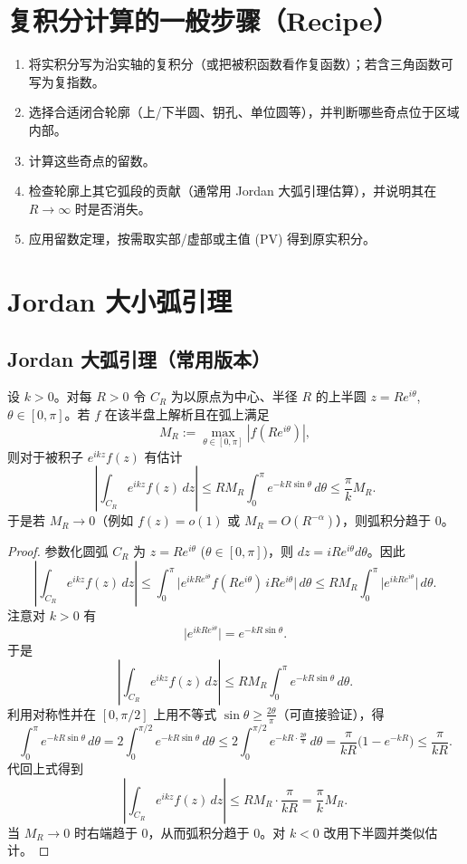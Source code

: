 \documentclass[lang=cn,10pt]{elegantbook}
\begin{document}
	\section{复积分计算的一般步骤（Recipe）}
	\begin{enumerate}[leftmargin=*,itemsep=4pt]
		\item 将实积分写为沿实轴的复积分（或把被积函数看作复函数）；若含三角函数可写为复指数。
		\item 选择合适闭合轮廓（上/下半圆、钥孔、单位圆等），并判断哪些奇点位于区域内部。
		\item 计算这些奇点的留数。
		\item 检查轮廓上其它弧段的贡献（通常用 Jordan 大弧引理估算），并说明其在 \(R\to\infty\) 时是否消失。
		\item 应用留数定理，按需取实部/虚部或主值 (PV) 得到原实积分。
	\end{enumerate}
	
	\section{Jordan 大小弧引理}
	\subsection{Jordan 大弧引理（常用版本）}
	
	\begin{definition}
		 设 \(k>0\)。对每 \(R>0\) 令 \(C_R\) 为以原点为中心、半径 \(R\) 的上半圆 \(z=R e^{i\theta}\), \(\theta\in[0,\pi]\)。若 \(f\) 在该半盘上解析且在弧上满足
		\[
		M_R:=\max_{\theta\in[0,\pi]}|f(R e^{i\theta})|,
		\]
		则对于被积子 \(e^{ikz}f(z)\) 有估计
		\[
		\left|\int_{C_R} e^{ikz} f(z)\,dz\right|
		\le R M_R \int_0^\pi e^{-kR\sin\theta}\,d\theta
		\le \frac{\pi}{k} M_R.
		\]
		于是若 \(M_R\to0\)（例如 \(f(z)=o(1)\) 或 \(M_R=O(R^{-\alpha})\)），则弧积分趋于 \(0\)。
	\end{definition}
	
	\begin{proof}
	参数化圆弧 \(C_R\) 为 \(z=Re^{i\theta}\) (\(\theta\in[0,\pi]\))，则 \(dz=iR e^{i\theta}d\theta\)。因此
	\[
	\left|\int_{C_R} e^{ikz} f(z)\,dz\right|
	\le \int_0^\pi \big|e^{ikRe^{i\theta}} f(Re^{i\theta})\, iR e^{i\theta}\big|\,d\theta
	\le R M_R \int_0^\pi \big|e^{ikRe^{i\theta}}\big|\,d\theta.
	\]
	注意对 \(k>0\) 有
	\[
	\big|e^{ikRe^{i\theta}}\big| = e^{-kR\sin\theta}.
	\]
	于是
	\[
	\left|\int_{C_R} e^{ikz} f(z)\,dz\right|
	\le R M_R \int_0^\pi e^{-kR\sin\theta}\,d\theta.
	\]
	利用对称性并在 \([0,\pi/2]\) 上用不等式 \(\sin\theta\ge \tfrac{2\theta}{\pi}\)（可直接验证），得
	\[
	\int_0^\pi e^{-kR\sin\theta}\,d\theta
	=2\int_0^{\pi/2} e^{-kR\sin\theta}\,d\theta
	\le 2\int_0^{\pi/2} e^{-kR\cdot \tfrac{2\theta}{\pi}}\,d\theta
	= \frac{\pi}{kR}\big(1-e^{-kR}\big)
	\le \frac{\pi}{kR}.
	\]
	代回上式得到
	\[
	\left|\int_{C_R} e^{ikz} f(z)\,dz\right|
	\le R M_R \cdot \frac{\pi}{kR} = \frac{\pi}{k} M_R.
	\]
	当 \(M_R\to0\) 时右端趋于 \(0\)，从而弧积分趋于 \(0\)。对 \(k<0\) 改用下半圆并类似估计。
\end{proof}
	
\end{document}
